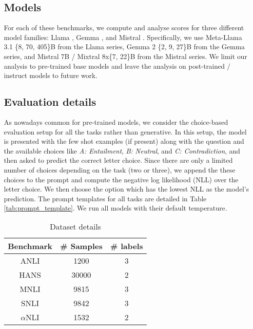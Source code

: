 
\subsection{Models} For each of these benchmarks, we compute and analyse scores for three different model families: Llama \citep{dubey2024llama}, Gemma \citep{team2024gemma}, and Mistral \citep{jiang2023mistral, jiang2024mixtral}. 
Specifically, we use Meta-Llama 3.1 \{8, 70, 405\}B from the Llama series, Gemma 2 \{2, 9, 27\}B from the Gemma series, and Mistral 7B / Mixtral 8x\{7, 22\}B from the Mistral series.
We limit our analysis to pre-trained base models and leave the analysis on post-trained / instruct models to future work.

\subsection{Evaluation details}
As nowadays common for pre-trained models, we consider the choice-based evaluation setup for all the tasks rather than generative. 
In this setup, the model is presented with the few shot examples (if present) along with the question and the available choices like \textit{A: Entailment}, \textit{B: Neutral}, and \textit{C: Contradiction}, and then asked to predict the correct letter choice. 
Since there are only a limited number of choices depending on the task (two or three), we append the these choices to the prompt and compute the negative log likelihood (NLL) over the letter choice. 
We then choose the option which has the lowest NLL as the model's prediction. 
The prompt templates for all tasks are detailed in Table \ref{tab:prompt_template}.
We run all models with their default temperature.



\begin{table}
  \centering
  \begin{tabular}{c|c|c}
    Benchmark & \# Samples & \# labels \\
    \hline
    ANLI & 1200 & 3 \\
    HANS & 30000 & 2 \\
    MNLI & 9815 & 3 \\
    SNLI & 9842 & 3 \\
    $\alpha$NLI & 1532 & 2 \\
  \end{tabular}
\caption{Dataset details}
\label{tab:dataset}
\end{table}
